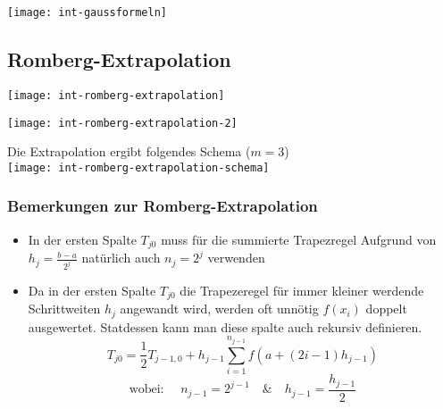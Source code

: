 \texttt{[image: int-gaussformeln]}






\subsection{Romberg-Extrapolation}

\texttt{[image: int-romberg-extrapolation]}

\texttt{[image: int-romberg-extrapolation-2]}

{\Large Die Extrapolation ergibt folgendes Schema ($m = 3$)}\\
\texttt{[image: int-romberg-extrapolation-schema]}


\subsubsection{Bemerkungen zur Romberg-Extrapolation}

\begin{itemize}
	\item In der ersten Spalte $T_{j0}$ muss für die summierte Trapezregel Aufgrund
	      von $h_j = \frac{b-a}{2^j}$ natürlich auch $n_j = 2^j$ verwenden
	\item Da in der ersten Spalte $T_{j0}$ die Trapezeregel für immer kleiner
	      werdende Schrittweiten $h_j$ angewandt wird, werden oft unnötig $f(x_i)$
	      doppelt ausgewertet. Statdessen kann man diese spalte auch rekursiv definieren.
          $$T_{j0} = \frac{1}{2} T_{j-1,0} + h_{j-1}
            \sum_{i=1}^{n_{j-1}} f(a + (2i-1)h_{j-1})$$
          $$\text{wobei: } \quad n_{j-1} = 2^{j-1} \quad \& \quad h_{j-1} = \frac{h_{j-1}}{2}$$
\end{itemize}



